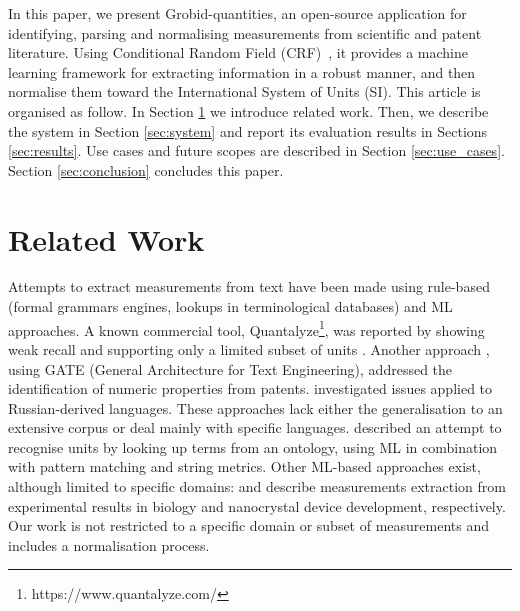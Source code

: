 \documentclass[sigconf]{acmart}
\begin{document}
In this paper, we present Grobid-quantities, an open-source application for identifying, parsing and normalising measurements from scientific and patent literature. Using Conditional Random Field (CRF)~\cite{lafferty2001conditional}, it provides a machine learning framework for extracting information in a robust manner, and then normalise them toward the International System of Units (SI). 
This article is organised as follow. In Section \ref{sec:related_work} we introduce related work. Then, we describe the system in Section \ref{sec:system} and report its evaluation results in Sections \ref{sec:results}. Use cases and future scopes are described in Section \ref{sec:use_cases}. Section \ref{sec:conclusion} concludes this paper.

\section{Related Work}
\label{sec:related_work}
Attempts to extract measurements from text have been made using rule-based (formal grammars engines, lookups in terminological databases) and ML approaches. A known commercial tool, Quantalyze\footnote{https://www.quantalyze.com/}, was reported by \cite{hundman2017measurement} showing weak recall and supporting only a limited subset of units \cite{aras2014applications}. Another approach \cite{agatonovic2008large}, using GATE (General Architecture for Text Engineering), addressed the identification of numeric properties from patents. \cite{am2013processing} investigated issues applied to Russian-derived languages. These approaches lack either the generalisation to an extensive corpus or deal mainly with specific languages. \cite{berrahou2013extract} described an attempt to recognise units by looking up terms from an ontology, using ML in combination with pattern matching and string metrics. Other ML-based approaches exist, although limited to specific domains: \cite{kang_extracting_2013} and \cite{dieb2015framework} describe measurements extraction from experimental results in biology and nanocrystal device development, respectively. Our work is not restricted to a specific domain or subset of measurements and includes a normalisation process. 
\end{document}
